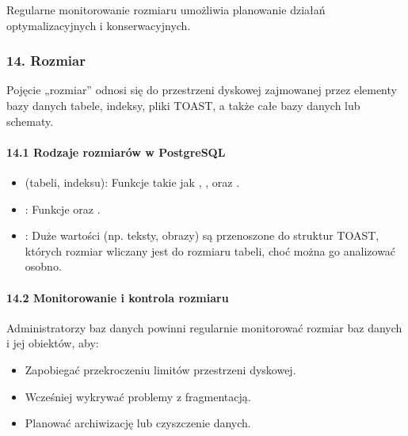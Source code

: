 \documentclass[letterpaper,10pt,polish]{sphinxmanual}
\begin{document}
\sphinxAtStartPar
Regularne monitorowanie rozmiaru umożliwia planowanie działań optymalizacyjnych i konserwacyjnych.


\subsubsection{14. Rozmiar}
\label{\detokenize{rozdzial2/Konfiguracja_baz_danych/Konfiguracja_baz_danych:rozmiar}}
\sphinxAtStartPar
Pojęcie „rozmiar” odnosi się do przestrzeni dyskowej zajmowanej przez elementy bazy danych \textendash{} tabele, indeksy, pliki TOAST, a także całe bazy danych lub schematy.


\paragraph{14.1 Rodzaje rozmiarów w PostgreSQL}
\label{\detokenize{rozdzial2/Konfiguracja_baz_danych/Konfiguracja_baz_danych:rodzaje-rozmiarow-w-postgresql}}\begin{itemize}
\item {} 
\sphinxAtStartPar
{} (tabeli, indeksu):
Funkcje takie jak , ,  oraz .

\item {} 
\sphinxAtStartPar
{}:
Funkcje  oraz .

\item {} 
\sphinxAtStartPar
{}:
Duże wartości (np. teksty, obrazy) są przenoszone do struktur TOAST, których rozmiar wliczany jest do rozmiaru tabeli, choć można go analizować osobno.

\end{itemize}


\paragraph{14.2 Monitorowanie i kontrola rozmiaru}
\label{\detokenize{rozdzial2/Konfiguracja_baz_danych/Konfiguracja_baz_danych:monitorowanie-i-kontrola-rozmiaru}}
\sphinxAtStartPar
Administratorzy baz danych powinni regularnie monitorować rozmiar baz danych i jej obiektów, aby:
\begin{itemize}
\item {} 
\sphinxAtStartPar
Zapobiegać przekroczeniu limitów przestrzeni dyskowej.

\item {} 
\sphinxAtStartPar
Wcześniej wykrywać problemy z fragmentacją.

\item {} 
\sphinxAtStartPar
Planować archiwizację lub czyszczenie danych.

\end{itemize}
\end{document}

